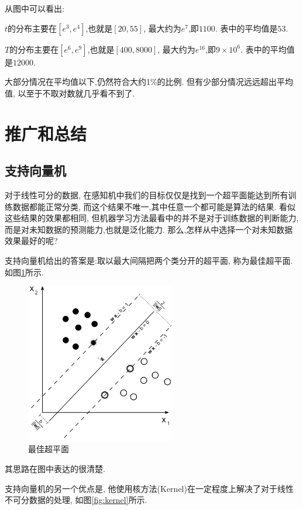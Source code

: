\documentclass[a4paper,12pt]{article}
\begin{document}
			从图中可以看出:

			$t$的分布主要在$[e^3,e^4]$,也就是$[20,55]$,
			最大约为$e^7$,即$1100$.
			表中的平均值是$53$.

			$T$的分布主要在$[e^6,e^9]$,也就是$[400,8000]$,
			最大约为$e^{16}$,即$9\times10^6$.
			表中的平均值是$12000$.
			
			大部分情况在平均值以下,仍然符合大约1\%的比例.
			但有少部分情况远远超出平均值,
			以至于不取对数就几乎看不到了.

	


	\section{推广和总结}
		\label{sec:extension}
		
		\subsection{支持向量机}
			
			对于线性可分的数据,
			在感知机中我们的目标仅仅是找到一个超平面能达到所有训练数据都能正常分类,
			而这个结果不唯一,其中任意一个都可能是算法的结果.
			看似这些结果的效果都相同,
			但机器学习方法最看中的并不是对于训练数据的判断能力,
			而是对未知数据的预测能力,也就是泛化能力.
			那么,怎样从中选择一个对未知数据效果最好的呢?

			支持向量机给出的答案是:取以最大间隔把两个类分开的超平面,
			称为最佳超平面.
			如图\ref{fig:max margin}所示.

			\begin{figure}[htbp]
				\centering
				\includegraphics[width=6.5cm]{./fig/max_margin.png}
				\caption{最佳超平面}\label{fig:max margin}
			\end{figure}

			其思路在图中表达的很清楚.

			支持向量机的另一个优点是,
			他使用核方法(Kernel)在一定程度上解决了对于线性不可分数据的处理,
			如图\ref{fig:kernel}所示.
\end{document}

